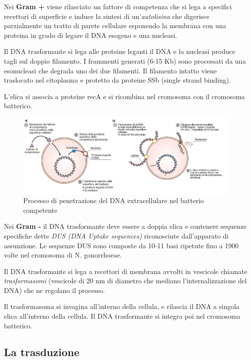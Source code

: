 \documentclass[11pt]{book}
\begin{document}
Nei \textbf{Gram +} viene rilasciato un fattore di competenza che si lega a specifici recettori di superficie e induce la sintesi di un’\emph{autolisina} che digerisce parzialmente un tratto di parete cellulare esponendo la membrana con una proteina in grado di legare il DNA esogeno e una nucleasi.

Il DNA trasformante si lega alle proteine leganti il DNA e la nucleasi produce tagli sul doppio filamento.
I frammenti generati (6-15 Kb) sono processati da una esonucleasi che degrada uno dei due filamenti.
Il filamento intatto viene traslocato nel citoplasma e protetto da proteine SSb (single strand binding).

L’elica si associa a proteine recA e si ricombina nel cromosoma con il cromosoma batterico.

\begin{figure}[htp]
\centering
\includegraphics[scale=0.5]{img/Entrata DNA (trasformazione).png}
\caption{Processo di penetrazione del DNA extracellulare nel batterio competente}
\label{}
\end{figure}


Nei \textbf{Gram -} il DNA trasformante deve essere a doppia elica e contenere sequenze specifiche dette \emph{DUS (DNA Uptake sequences)} riconosciute dall’apparato di assunzione.
Le sequenze DUS sono composte da 10-11 basi ripetute fino a 1900 volte nel cromosoma di N. gonorrhoeae.


Il DNA trasformante si lega a recettori di membrana avvolti in vescicole chiamate \emph{trasformasomi} (vescicole di 20 nm di diametro che mediano l’internalizzazione del DNA) che ne regolano il processo.

Il trasformasoma si invagina all'interno della cellula, e rilascia il DNA a singola elica all'interno della cellula.
Il DNA trasformante si integra poi nel cromosoma batterico.

\subsection{La trasduzione}
\end{document}
